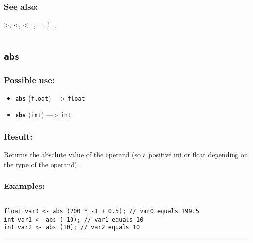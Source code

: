 \documentclass[]{book}
\providecommand{\tightlist}{%
  \setlength{\itemsep}{0pt}\setlength{\parskip}{0pt}}
\theoremstyle{definition}
\theoremstyle{definition}
\theoremstyle{definition}
\theoremstyle{remark}
\begin{document}
\subsubsection{See also:}\label{see-also-13}

\href{OperatorsAA\#\%3E}{\textgreater{}},
\href{OperatorsAA\#\%3C}{\textless{}},
\href{OperatorsAA\#\%3C=}{\textless{}=}, \href{OperatorsAA\#=}{=},
\href{OperatorsAA\#!=}{!=},

\begin{center}\rule{0.5\linewidth}{\linethickness}\end{center}

\subsection{\texorpdfstring{\texttt{abs}}{abs}}\label{abs}

\subsubsection{Possible use:}\label{possible-use-16}

\begin{itemize}
\tightlist
\item
  \textbf{\texttt{abs}} (\texttt{float}) ---\textgreater{}
  \texttt{float}
\item
  \textbf{\texttt{abs}} (\texttt{int}) ---\textgreater{} \texttt{int}
\end{itemize}

\subsubsection{Result:}\label{result-15}

Returns the absolute value of the operand (so a positive int or float
depending on the type of the operand).

\subsubsection{Examples:}\label{examples-12}

\begin{verbatim}
 
float var0 <- abs (200 * -1 + 0.5); // var0 equals 199.5 
int var1 <- abs (-10); // var1 equals 10 
int var2 <- abs (10); // var2 equals 10
\end{verbatim}

\begin{center}\rule{0.5\linewidth}{\linethickness}\end{center}
\end{document}
